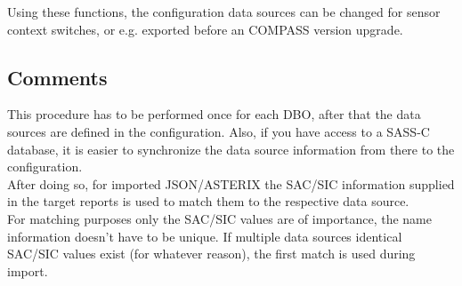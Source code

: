 Using these functions, the configuration data sources can be changed for sensor context switches, or e.g. exported before an COMPASS version upgrade.

\subsection{Comments}

This procedure  has to be performed once for each DBO, after that the data sources are defined in the configuration. Also, if you have access to a SASS-C database, it is easier to synchronize the data source information from there to the configuration. \\

After doing so, for imported JSON/ASTERIX the SAC/SIC information supplied in the target reports is used to match them to the respective data source. \\

For matching purposes only the SAC/SIC values are of importance, the name information doesn't have to be unique. If multiple data sources identical SAC/SIC values exist (for whatever reason), the first match is used during import. 
